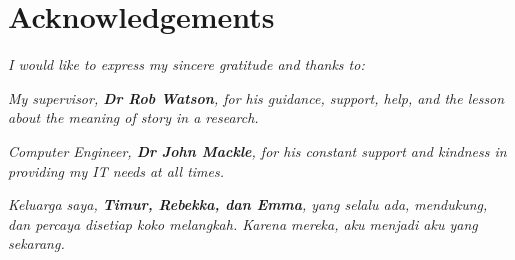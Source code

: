 \newpage
\centering
\section*{Acknowledgements} 

\vspace{6cm}
\textit{I would like to express my sincere gratitude and thanks to:}

\vspace{1cm}

\textit{My supervisor, \textbf{Dr Rob Watson}, for his guidance, support, help, and the lesson about the meaning of story in a research.}

\textit{Computer Engineer, \textbf{Dr John Mackle}, for his constant support and kindness in providing my IT needs at all times.}

\textit{Keluarga saya, \textbf{Timur, Rebekka, dan Emma}, yang selalu ada, mendukung, dan percaya disetiap koko melangkah. Karena mereka, aku menjadi aku yang sekarang.}





